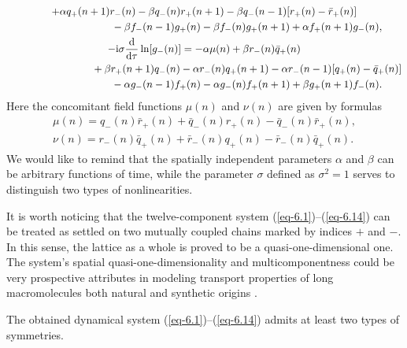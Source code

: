\documentclass[pdftex]{sigma}
\numberwithin{equation}{section}
\begin{document}
\begin{gather}
	 + \alpha q_{+}(n+1)r_{-}(n) - \beta q_{-}(n)r_{+}(n+1) - \beta q_{-}(n-1)[r_{+}(n)-\bar{r}_{+}(n)]\nonumber\\
 \hspace{0.25mm}\hphantom{+\mathrm{i}\sigma\frac{\mathrm{d}}{\mathrm{d}\tau}\ln[f_{-}(n)] =}{}
	 - \beta f_{-}(n-1)g_{+}(n) - \beta f_{-}(n)g_{+}(n+1) + \alpha f_{+}(n+1)g_{-}(n), \label{eq-6.11}
\\
	 -\mathrm{i}\sigma\frac{\mathrm{d}}{\mathrm{d}\tau}\ln[g_{-}(n)] = -\alpha \mu(n) + \beta r_{-}(n)\bar{q}_{+}(n)\nonumber\\
 \hspace{0.25mm}\hphantom{-\mathrm{i}\sigma\frac{\mathrm{d}}{\mathrm{d}\tau}\ln[g_{-}(n)] =}{}
	 + \beta r_{+}(n+1)q_{-}(n) - \alpha r_{-}(n)q_{+}(n+1) - \alpha r_{-}(n-1)[q_{+}(n)-\bar{q}_{+}(n)]\nonumber\\
 \hspace{0.25mm}\hphantom{-\mathrm{i}\sigma\frac{\mathrm{d}}{\mathrm{d}\tau}\ln[g_{-}(n)] =}{}
	 - \alpha g_{-}(n-1)f_{+}(n) - \alpha g_{-}(n)f_{+}(n+1) + \beta g_{+}(n+1)f_{-}(n) . \label{eq-6.12}
\end{gather}
Here the concomitant field functions $\mu(n)$ and $\nu(n)$ are given by formulas
\begin{gather}\label{eq-6.13}
	\mu(n) = q_{-}(n)\bar{r}_{+}(n)+\bar{q}_{-}(n)r_{+}(n)-\bar{q}_{-}(n)\bar{r}_{+}(n),
\\ \label{eq-6.14}
	\nu(n) = r_{-}(n)\bar{q}_{+}(n)+\bar{r}_{-}(n)q_{+}(n)-\bar{r}_{-}(n)\bar{q}_{+}(n) .
\end{gather}
We would like to remind that the spatially independent parameters $\alpha$ and $\beta$ can be arbitrary functions of time, while the parameter $\sigma$ defined as $\sigma^{2}=1$ serves to distinguish two types of nonlinearities.

It is worth noticing that the twelve-component system (\ref{eq-6.1})--(\ref{eq-6.14}) can be treated as settled on two mutually coupled chains marked by indices $+$ and $-$. In this sense, the lattice as a whole is proved to be a quasi-one-dimensional one. The system's spatial quasi-one-dimensionality and multicomponentness could be very prospective attributes in modeling transport properties of long macromolecules both natural and synthetic origins \cite{chen-AM-32-2001893, perepelytsya-EBJ-50-759, satchanska-PM-16-1159}.

The obtained dynamical system (\ref{eq-6.1})--(\ref{eq-6.14}) admits at least two types of symmetries.
\end{document}

